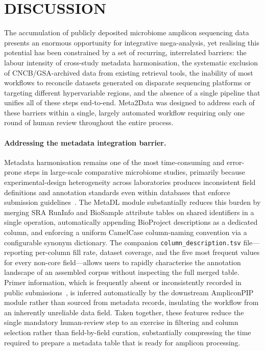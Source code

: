 \section*{DISCUSSION}

The accumulation of publicly deposited microbiome amplicon sequencing data presents
an enormous opportunity for integrative mega-analysis, yet realising this potential
has been constrained by a set of recurring, interrelated barriers: the labour
intensity of cross-study metadata harmonisation, the systematic exclusion of
CNCB/GSA-archived data from existing retrieval tools, the inability of most
workflows to reconcile datasets generated on disparate sequencing platforms or
targeting different hypervariable regions, and the absence of a single pipeline
that unifies all of these steps end-to-end.
Meta2Data was designed to address each of these barriers within a single,
largely automated workflow requiring only one round of human review throughout the
entire process.

\paragraph{Addressing the metadata integration barrier.}
Metadata harmonisation remains one of the most time-consuming and error-prone
steps in large-scale comparative microbiome studies, primarily because
experimental-design heterogeneity across laboratories produces inconsistent field
definitions and annotation standards even within databases that enforce submission
guidelines~\citep{cernava2022metadata, kim2025fair, bustos2026nonstandardized}.
The MetaDL module substantially reduces this burden by merging SRA RunInfo and
BioSample attribute tables on shared identifiers in a single operation, automatically
appending BioProject descriptions as a dedicated column, and enforcing a uniform
CamelCase column-naming convention via a configurable synonym dictionary.
The companion \texttt{column\_description.tsv} file---reporting per-column fill
rate, dataset coverage, and the five most frequent values for every non-core
field---allows users to rapidly characterise the annotation landscape of an assembled
corpus without inspecting the full merged table.
Primer information, which is frequently absent or inconsistently recorded in
public submissions~\citep{kim2025fair}, is inferred automatically by the downstream
AmpliconPIP module rather than sourced from metadata records, insulating the workflow
from an inherently unreliable data field.
Taken together, these features reduce the single mandatory human-review step to an
exercise in filtering and column selection rather than field-by-field curation,
substantially compressing the time required to prepare a metadata table that is ready
for amplicon processing.

